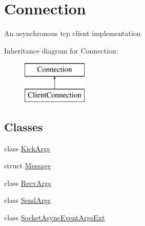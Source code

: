 \hypertarget{classOTA_1_1Sockets_1_1Connection}{}\section{Connection}
\label{classOTA_1_1Sockets_1_1Connection}


An asynchronous tcp client implementation  


Inheritance diagram for Connection\+:\begin{figure}[H]
\begin{center}
\leavevmode
\includegraphics[height=2.000000cm]{classOTA_1_1Sockets_1_1Connection}
\end{center}
\end{figure}
\subsection*{Classes}
\begin{DoxyCompactItemize}
\item 
class \hyperlink{classOTA_1_1Sockets_1_1Connection_1_1KickArgs}{Kick\+Args}
\item 
struct \hyperlink{structOTA_1_1Sockets_1_1Connection_1_1Message}{Message}
\item 
class \hyperlink{classOTA_1_1Sockets_1_1Connection_1_1RecvArgs}{Recv\+Args}
\item 
class \hyperlink{classOTA_1_1Sockets_1_1Connection_1_1SendArgs}{Send\+Args}
\item 
class \hyperlink{classOTA_1_1Sockets_1_1Connection_1_1SocketAsyncEventArgsExt}{Socket\+Async\+Event\+Args\+Ext}
\end{DoxyCompactItemize}
